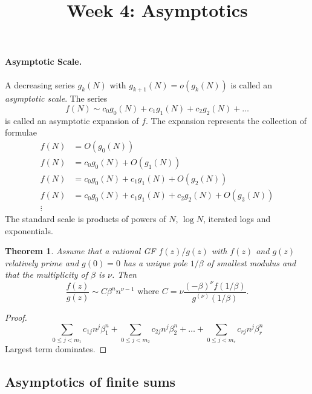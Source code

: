 \documentclass{article}
\newtheorem{theorem}{Theorem}
\begin{document}
\title{Week 4: Asymptotics}
\maketitle

\paragraph{Asymptotic Scale.} A decreasing series $g_k(N)$ with $g_{k+1}(N) =
o(g_k(N))$ is called an \emph{asymptotic scale}. The series \begin{equation*}
  f(N) \sim c_0g_0(N) + c_1g_1(N) + c_2g_2(N) + \ldots
\end{equation*} is called an asymptotic expansion of $f$. The expansion
represents the collection of formulae \begin{align*}
  f(N) &= O(g_0(N)) \\
  f(N) &= c_0g_0(N) + O(g_1(N)) \\
  f(N) &= c_0g_0(N) + c_1g_1(N) + O(g_2(N)) \\
  f(N) &= c_0g_0(N) + c_1g_1(N) + c_2g_2(N) + O(g_3(N)) \\
  \vdots
\end{align*} The standard scale is products of powers of $N$, $\log N$,
iterated logs and exponentials.

\begin{theorem}
  Assume that a rational GF $f(z)/g(z)$ with $f(z)$ and $g(z)$ relatively
  prime and $g(0) = 0$ has a unique pole $1/\beta$ of smallest modulus and that
  the multiplicity of $\beta$ is $\nu$. Then \begin{equation*}
    [z^n]\frac{f(z)}{g(z)} \sim C\beta^nn^{\nu - 1} \text{ where } C = \nu
      \frac{(-\beta)^{\nu}f(1/\beta)}{g^{(\nu)}(1/\beta)}.
  \end{equation*}
\end{theorem}

\begin{proof}
  \begin{equation*}
    \sum_{0 \leq j < m_1} c_{1j}n^j\beta_1^n + \sum_{0 \leq j < m_2}c_{2j}n^j
      \beta_2^n + \ldots + \sum_{0 \leq j < m_r}c_{rj}n^j\beta_r^n
  \end{equation*} Largest term dominates.
\end{proof}

\subsection{Asymptotics of finite sums}
\end{document}

